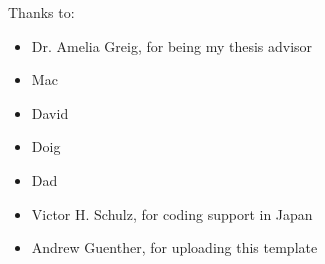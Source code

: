 \noindent
Thanks to:
\begin{itemize}
    \item Dr. Amelia Greig, for being my thesis advisor
    \item Mac
    \item David
    \item Doig
    \item Dad
    \item Victor H. Schulz, for coding support in Japan
    \item Andrew Guenther, for uploading this template
\end{itemize}
